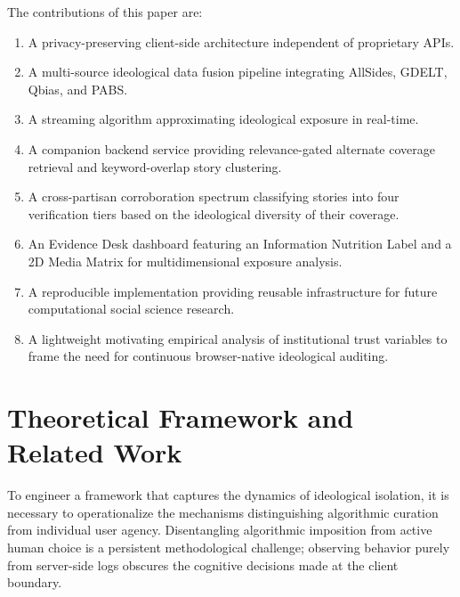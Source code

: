\documentclass[10pt, conference, compsoc]{IEEEtran}
\begin{document}
The contributions of this paper are:
\begin{enumerate}
    \item A privacy-preserving client-side architecture independent of proprietary APIs.
    \item A multi-source ideological data fusion pipeline integrating AllSides, GDELT, Qbias, and PABS.
    \item A streaming algorithm approximating ideological exposure in real-time.
    \item A companion backend service providing relevance-gated alternate coverage retrieval and keyword-overlap story clustering.
    \item A cross-partisan corroboration spectrum classifying stories into four verification tiers based on the ideological diversity of their coverage.
    \item An Evidence Desk dashboard featuring an Information Nutrition Label and a 2D Media Matrix for multidimensional exposure analysis.
    \item A reproducible implementation providing reusable infrastructure for future computational social science research.
    \item A lightweight motivating empirical analysis of institutional trust variables to frame the need for continuous browser-native ideological auditing.
\end{enumerate}


\section{Theoretical Framework and Related Work}
To engineer a framework that captures the dynamics of ideological isolation, it is necessary to operationalize the mechanisms distinguishing algorithmic curation from individual user agency. Disentangling algorithmic imposition from active human choice is a persistent methodological challenge; observing behavior purely from server-side logs obscures the cognitive decisions made at the client boundary.
\end{document}

